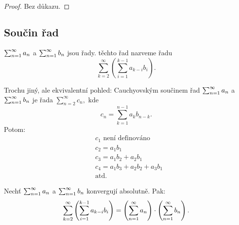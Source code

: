 \begin{proof}
    Bez důkazu.
\end{proof}

\subsection{Součin řad}

\begin{definition}
    \Necht $\sum_{n=1}^\infty a_n$ a $\sum_{n=1}^\infty b_n$ jsou řady. 
    těchto řad nazveme řadu
    $$\sum_{k=2}^\infty\left(\sum_{i=1}^{k-1}a_{k-i}b_i\right).$$
\end{definition}

\begin{remark}
    Trochu jiný, ale ekvivalentní pohled: 
    Cauchyovským součinem řad $\sum_{n=1}^\infty a_n$ a $\sum_{n=1}^\infty b_n$ 
    je řada $\sum_{n=2}^\infty{c_n},$ kde
    $$c_n = \sum_{k=1}^{n-1}a_kb_{n-k}.$$
    Potom:
    \begin{align*}
        &c_1 \text{ není definováno} \\
        &c_2 = a_1b_1 \\
        &c_3 = a_1b_2 + a_2b_1 \\
        &c_4 = a_1b_3 + a_2b_2 + a_3b_1 \\
        &\text{atd.}
    \end{align*}
\end{remark}

\begin{theorem}
    Nechť $\sum_{n=1}^\infty a_n$ a $\sum_{n=1}^\infty b_n$ konvergují absolutně. Pak:
    $$\sum_{k=2}^\infty\left(\sum_{i=1}^{k-1}a_{k-i}b_i\right) 
    = \left(\sum_{n=1}^\infty a_n\right)\cdot \left(\sum_{n=1}^\infty b_n\right).$$
\end{theorem}

